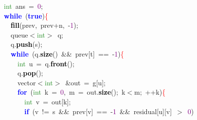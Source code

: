 {{\mbox{}\ \ \textcolor{ForestGreen}{int}\ ans\ \textcolor{BrickRed}{=}\ \textcolor{Purple}{0}\textcolor{BrickRed}{;} \\
\mbox{}\ \ \textbf{\textcolor{Blue}{while}}\ \textcolor{BrickRed}{(}\textbf{\textcolor{Blue}{true}}\textcolor{BrickRed}{)}\textcolor{Red}{\{} \\
\mbox{}\ \ \ \ \textbf{\textcolor{Black}{fill}}\textcolor{BrickRed}{(}prev\textcolor{BrickRed}{,}\ prev\textcolor{BrickRed}{+}n\textcolor{BrickRed}{,}\ \textcolor{BrickRed}{-}\textcolor{Purple}{1}\textcolor{BrickRed}{);} \\
\mbox{}\ \ \ \ queue\textcolor{BrickRed}{$<$}\textcolor{ForestGreen}{int}\textcolor{BrickRed}{$>$}\ q\textcolor{BrickRed}{;} \\
\mbox{}\ \ \ \ q\textcolor{BrickRed}{.}\textbf{\textcolor{Black}{push}}\textcolor{BrickRed}{(}s\textcolor{BrickRed}{);} \\
\mbox{}\ \ \ \ \textbf{\textcolor{Blue}{while}}\ \textcolor{BrickRed}{(}q\textcolor{BrickRed}{.}\textbf{\textcolor{Black}{size}}\textcolor{BrickRed}{()}\ \textcolor{BrickRed}{\&\&}\ prev\textcolor{BrickRed}{[}t\textcolor{BrickRed}{]}\ \textcolor{BrickRed}{==}\ \textcolor{BrickRed}{-}\textcolor{Purple}{1}\textcolor{BrickRed}{)}\textcolor{Red}{\{} \\
\mbox{}\ \ \ \ \ \ \textcolor{ForestGreen}{int}\ u\ \textcolor{BrickRed}{=}\ q\textcolor{BrickRed}{.}\textbf{\textcolor{Black}{front}}\textcolor{BrickRed}{();} \\
\mbox{}\ \ \ \ \ \ q\textcolor{BrickRed}{.}\textbf{\textcolor{Black}{pop}}\textcolor{BrickRed}{();} \\
\mbox{}\ \ \ \ \ \ vector\textcolor{BrickRed}{$<$}\textcolor{ForestGreen}{int}\textcolor{BrickRed}{$>$}\ \textcolor{BrickRed}{\&}out\ \textcolor{BrickRed}{=}\ g\textcolor{BrickRed}{[}u\textcolor{BrickRed}{];} \\
\mbox{}\ \ \ \ \ \ \textbf{\textcolor{Blue}{for}}\ \textcolor{BrickRed}{(}\textcolor{ForestGreen}{int}\ k\ \textcolor{BrickRed}{=}\ \textcolor{Purple}{0}\textcolor{BrickRed}{,}\ m\ \textcolor{BrickRed}{=}\ out\textcolor{BrickRed}{.}\textbf{\textcolor{Black}{size}}\textcolor{BrickRed}{();}\ k\textcolor{BrickRed}{$<$}m\textcolor{BrickRed}{;}\ \textcolor{BrickRed}{++}k\textcolor{BrickRed}{)}\textcolor{Red}{\{} \\
\mbox{}\ \ \ \ \ \ \ \ \textcolor{ForestGreen}{int}\ v\ \textcolor{BrickRed}{=}\ out\textcolor{BrickRed}{[}k\textcolor{BrickRed}{];} \\
\mbox{}\ \ \ \ \ \ \ \ \textbf{\textcolor{Blue}{if}}\ \textcolor{BrickRed}{(}v\ \textcolor{BrickRed}{!=}\ s\ \textcolor{BrickRed}{\&\&}\ prev\textcolor{BrickRed}{[}v\textcolor{BrickRed}{]}\ \textcolor{BrickRed}{==}\ \textcolor{BrickRed}{-}\textcolor{Purple}{1}\ \textcolor{BrickRed}{\&\&}\ residual\textcolor{BrickRed}{[}u\textcolor{BrickRed}{][}v\textcolor{BrickRed}{]}\ \textcolor{BrickRed}{$>$}\ \textcolor{Purple}{0}\textcolor{BrickRed}{)} \\
}}
